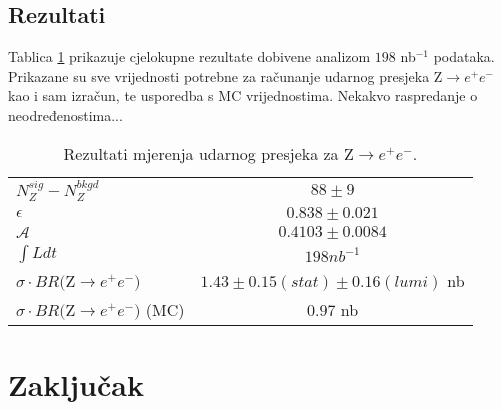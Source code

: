 \documentclass[a4paper,12pt]{report}
\newcommand{\proc}{Z$\rightarrow e^+ e^-$}
\begin{document}
\section{Rezultati}
\label{nepilaj}

Tablica \ref{tab:ukupno} prikazuje cjelokupne rezultate dobivene analizom $198$ nb$^{-1}$ podataka. Prikazane su sve vrijednosti potrebne za računanje udarnog presjeka \proc kao i sam izračun, te usporedba s MC vrijednostima. Nekakvo raspredanje o neodređenostima...
\begin{table}[h!]
 \centering
 \begin{tabular}{l c}
  \hline
  \hline
  $N_Z^{sig}-N_Z^{bkgd}$ & $88 \pm 9$ \\
  $\epsilon$ & $0.838 \pm 0.021$ \\
  $\mathcal{A}$ & $0.4103 \pm 0.0084$ \\
  $\int L dt$ & $ 198 nb^{-1}$ \\
  \hline
  $\sigma\cdot BR($\proc$)$ & $1.43 \pm 0.15 (stat) \pm 0.16 (lumi)$ nb\\
  $\sigma\cdot BR($\proc$)$ (MC) & $0.97$ nb\\
  \hline
  \hline	
 \end{tabular}
\label{tab:ukupno}
\caption{Rezultati mjerenja udarnog presjeka za \proc.}
\end{table}
 

\chapter{Zaključak}
\label{ch:conc}



\end{document}
